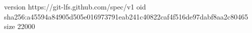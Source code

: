 version https://git-lfs.github.com/spec/v1
oid sha256:a45594a84905d505e016973791eab241c40822caf4f516de97dabf8aa2c80465
size 22000
